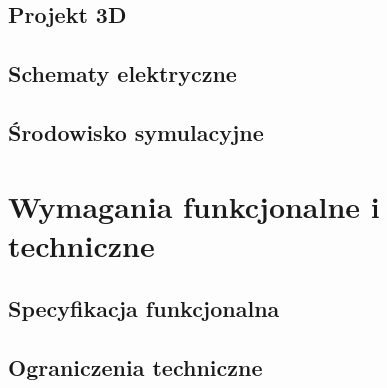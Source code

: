     \subsection{Projekt 3D}
        \noindent \lipsum[4-5]

    \subsection{Schematy elektryczne}
        \noindent \lipsum[6-7]
        
    \subsection{Środowisko symulacyjne}
        \noindent \lipsum[8-9]


\clearpage\section{Wymagania funkcjonalne i techniczne}
    \noindent \lipsum[1-3]

    \subsection{Specyfikacja funkcjonalna}
        \noindent \lipsum[4-5]

    \subsection{Ograniczenia techniczne}
        \noindent \lipsum[6-7]